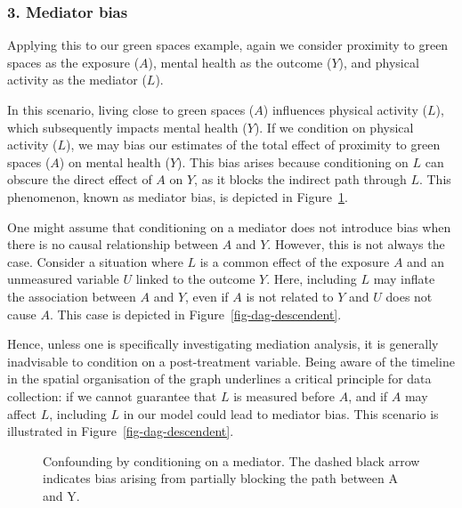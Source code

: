 \documentclass[
  singlecolumn]{article}
\begin{document}
\subsubsection{3. Mediator bias}\label{mediator-bias}

Applying this to our green spaces example, again we consider proximity
to green spaces as the exposure (\(A\)), mental health as the outcome
(\(Y\)), and physical activity as the mediator (\(L\)).

In this scenario, living close to green spaces (\(A\)) influences
physical activity (\(L\)), which subsequently impacts mental health
(\(Y\)). If we condition on physical activity (\(L\)), we may bias our
estimates of the total effect of proximity to green spaces (\(A\)) on
mental health (\(Y\)). This bias arises because conditioning on \(L\)
can obscure the direct effect of \(A\) on \(Y\), as it blocks the
indirect path through \(L\). This phenomenon, known as mediator bias, is
depicted in Figure~\ref{fig-dag-mediator}.

One might assume that conditioning on a mediator does not introduce bias
when there is no causal relationship between \(A\) and \(Y\). However,
this is not always the case. Consider a situation where \(L\) is a
common effect of the exposure \(A\) and an unmeasured variable \(U\)
linked to the outcome \(Y\). Here, including \(L\) may inflate the
association between \(A\) and \(Y\), even if \(A\) is not related to
\(Y\) and \(U\) does not cause \(A\). This case is depicted in
Figure~\ref{fig-dag-descendent}.

Hence, unless one is specifically investigating mediation analysis, it
is generally inadvisable to condition on a post-treatment variable.
Being aware of the timeline in the spatial organisation of the graph
underlines a critical principle for data collection: if we cannot
guarantee that \(L\) is measured before \(A\), and if \(A\) may affect
\(L\), including \(L\) in our model could lead to mediator bias. This
scenario is illustrated in Figure~\ref{fig-dag-descendent}.

\begin{figure}


\caption{\label{fig-dag-mediator}Confounding by conditioning on a
mediator. The dashed black arrow indicates bias arising from partially
blocking the path between A and Y.}

\end{figure}%
\end{document}
